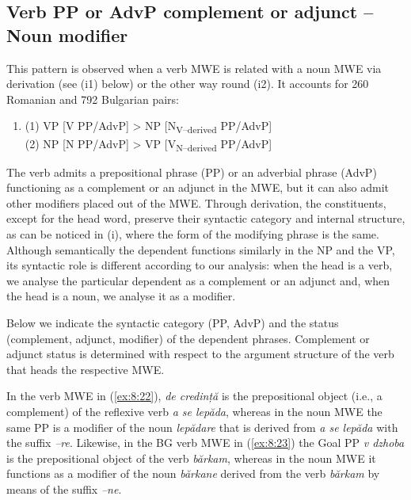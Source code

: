 \documentclass[output=paper]{langsci/langscibook}
\begin{document}
\subsection{Verb PP or AdvP complement or adjunct – Noun modifier}
\label{section61}

This pattern is observed when a verb MWE is related with a noun MWE via
derivation (see (i1) below) or the other way round (i2). It accounts
for 260 Romanian and 792 Bulgarian pairs:


\renewcommand{\theenumi}{(\roman{enumi})}%
\begin{enumerate}
\item (1) VP [V PP/AdvP] > NP [N\textsubscript{V–derived }PP/AdvP]\\ 
(2) NP [N PP/AdvP] > VP [V\textsubscript{N–derived} PP/AdvP]
\end{enumerate}


The verb admits a prepositional phrase (PP) or an adverbial phrase
(AdvP) functioning as a complement or an adjunct in the MWE, but it can
also admit other modifiers placed out of the MWE. Through derivation,
the constituents, except for the head word, preserve their syntactic
category and internal structure, as can be noticed in (i), where the
form of the modifying phrase is the same. Although semantically the
dependent functions similarly in the NP and the VP, its syntactic role
is different according to our analysis: when the head is a verb, we
analyse the particular dependent as a complement or an adjunct and,
when the head is a noun, we analyse it as a modifier.



Below we indicate the syntactic category (PP, AdvP) and the status
(complement, adjunct, modifier) of the dependent phrases. Complement or
adjunct status is determined with respect to the argument structure of
the verb that heads the respective MWE.



In the verb MWE in (\ref{ex:8:22}), \textit{de credință} is the prepositional object
(i.e., a complement) of the reflexive verb \textit{a se lepăda}, whereas in
the noun MWE the same PP is a modifier of the noun \textit{lepădare} that is
derived from \textit{a se lepăda} with the suffix \textit{–re}. Likewise, in the BG
verb MWE in (\ref{ex:8:23}) the Goal PP \textit{v dzhoba} is the prepositional object of
the verb \textit{bărkam}, whereas in the noun MWE it functions as a modifier
of the noun \textit{bărkane} derived from the verb \textit{bărkam} by means of the
suffix \textit{–ne}. 
\end{document}
